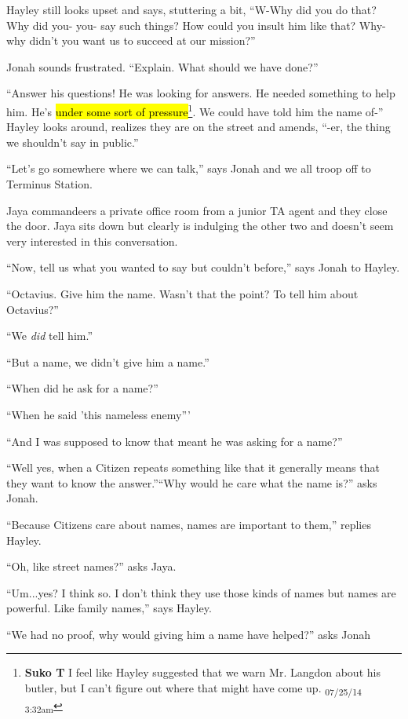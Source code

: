 Hayley still looks upset and says, stuttering a bit, ``W-Why did you do that? Why did you- you- say such things?  How could you insult him like that?  Why- why didn't you want us to succeed at our mission?''

Jonah sounds frustrated.  ``Explain.  What should we have done?''

``Answer his questions!  He was looking for answers.  He needed something to help him.  He's \hl{under some sort of pressure}\footnote{\textbf{Suko T }I feel like Hayley suggested that we warn Mr. Langdon about his butler, but I can't figure out where that might have come up. \textsubscript{07/25/14 3:32am}}.  We could have told him the name of-'' Hayley looks around, realizes they are on the street and amends, ``-er, the thing we shouldn't say in public.''

``Let's go somewhere where we can talk,'' says Jonah and we all troop off to Terminus Station.



Jaya commandeers a private office room from a junior TA agent and they close the door.  Jaya sits down but clearly is indulging the other two and doesn't seem very interested in this conversation.

``Now, tell us what you wanted to say but couldn't before,'' says Jonah to Hayley.

``Octavius.  Give him the name.  Wasn't that the point?  To tell him about Octavius?''

``We \textit{did} tell him.''

``But a name, we didn't give him a name.''

``When did he ask for a name?''

``When he said 'this nameless enemy'''

``And I was supposed to know that meant he was asking for a name?''

``Well yes, when a Citizen repeats something like that it generally means that they want to know the answer.''``Why would he care what the name is?'' asks Jonah.

``Because Citizens care about names, names are important to them,'' replies Hayley.

``Oh, like street names?'' asks Jaya.

``Um...yes?  I think so.  I don't think they use those kinds of names but names are powerful.  Like family names,'' says Hayley.

``We had no proof, why would giving him a name have helped?'' asks Jonah

